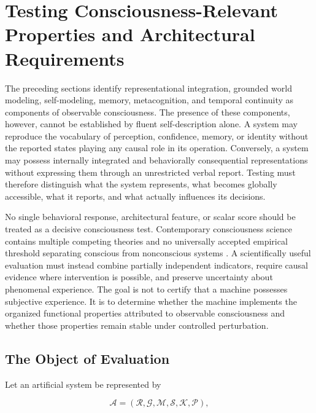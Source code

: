 \section{\textbf{Testing Consciousness-Relevant Properties and Architectural Requirements}}
\label{sec:testing-framework}

The preceding sections identify representational integration, grounded world modeling, self-modeling, memory, metacognition, and temporal continuity as components of observable consciousness. The presence of these components, however, cannot be established by fluent self-description alone. A system may reproduce the vocabulary of perception, confidence, memory, or identity without the reported states playing any causal role in its operation. Conversely, a system may possess internally integrated and behaviorally consequential representations without expressing them through an unrestricted verbal report. Testing must therefore distinguish what the system represents, what becomes globally accessible, what it reports, and what actually influences its decisions.

No single behavioral response, architectural feature, or scalar score should be treated as a decisive consciousness test. Contemporary consciousness science contains multiple competing theories and no universally accepted empirical threshold separating conscious from nonconscious systems \cite{seth2022theories,butlin2023consciousness}. A scientifically useful evaluation must instead combine partially independent indicators, require causal evidence where intervention is possible, and preserve uncertainty about phenomenal experience. The goal is not to certify that a machine possesses subjective experience. It is to determine whether the machine implements the organized functional properties attributed to observable consciousness and whether those properties remain stable under controlled perturbation.

\subsection{The Object of Evaluation}

Let an artificial system be represented by

\begin{equation}
\mathcal{A}
=
\left(
\mathcal{R},
\mathcal{G},
\mathcal{M},
\mathcal{S},
\mathcal{K},
\mathcal{P}
\right),
\label{eq:system-evaluation-object}
\end{equation}

